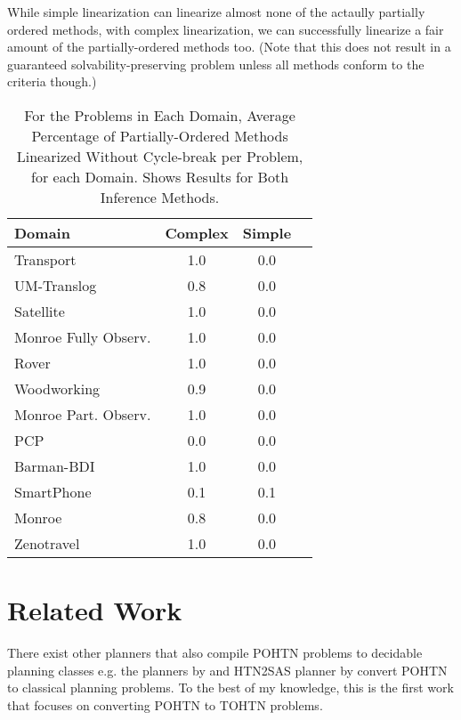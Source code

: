 \documentclass[letterpaper]{article} %
\begin{document}
While simple linearization can linearize almost none of the actaully partially ordered methods, with complex linearization, we can successfully linearize a fair amount of the partially-ordered methods too. (Note that this does not result in a guaranteed solvability-preserving problem unless all methods conform to the criteria though.)
\begin{table} 
	\caption{For the Problems in Each Domain, Average Percentage of Partially-Ordered Methods Linearized Without Cycle-break per Problem, for each Domain. Shows Results for Both Inference Methods.}\label{} 
	\begin{tabular}{lccl} 
		\toprule 
		Domain & Complex & Simple &  \\ 
		\midrule
		Transport & 1.0 & 0.0  \\ 
		UM-Translog & 0.8 & 0.0  \\ 
		Satellite & 1.0 & 0.0  \\ 
		Monroe Fully Observ. & 1.0 & 0.0  \\ 
		Rover & 1.0 & 0.0  \\ 
		Woodworking & 0.9 & 0.0  \\ 
		Monroe Part. Observ. & 1.0 & 0.0  \\ 
		PCP & 0.0 & 0.0  \\ 
		Barman-BDI & 1.0 & 0.0  \\ 
		SmartPhone & 0.1 & 0.1  \\ 
		Monroe & 0.8 & 0.0  \\ 
		Zenotravel & 1.0 & 0.0  \\ 
		\bottomrule 
	\end{tabular} 
\end{table}  






\section{Related Work}
There exist other planners that also compile POHTN problems to decidable planning classes e.g. the planners by \cite{HTN2STRIPS} and HTN2SAS planner by \cite{HTN2SAS} convert POHTN to classical planning problems. To the best of my knowledge, this is the first work that focuses on converting POHTN to TOHTN problems.
\end{document}
